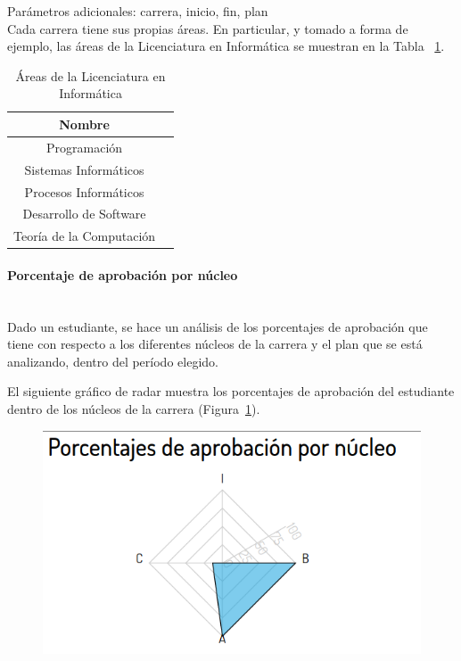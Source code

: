 Parámetros adicionales: carrera, inicio, fin, plan \\

Cada carrera tiene sus propias áreas. En particular, y tomado a forma de ejemplo, las áreas de la Licenciatura en Informática se muestran en la Tabla ~\ref{tab:tabla_areas}.

\begin{table}[!htbp]
    \centering
    \makegapedcells
    \begin{tabular}{|c|c|}
    \hline
    Nombre \\ \hline
    Programación \\ \hline
    Sistemas Informáticos \\ \hline
    Procesos Informáticos\\ \hline
    Desarrollo de Software \\ \hline
    Teoría de la Computación \\ \hline
    \end{tabular}
    \caption{Áreas de la Licenciatura en Informática}
    \label{tab:tabla_areas}
\end{table}

\paragraph{Porcentaje de aprobación por núcleo}\mbox{}\\

Dado un estudiante, se hace un análisis de los porcentajes de aprobación que tiene con respecto a los diferentes núcleos de la carrera y el plan que se está analizando, dentro del período elegido.

El siguiente gráfico de radar muestra los porcentajes de aprobación del estudiante dentro de los núcleos de la carrera (Figura~\ref{fig:sa-porcentaje-nucleo}).

\begin{figure}[H]
  \centering
    \includegraphics[scale=0.4]{images/seguimiento-academico/sa-porcentajesnucleo.png}
  \label{fig:sa-porcentaje-nucleo}
\end{figure}

